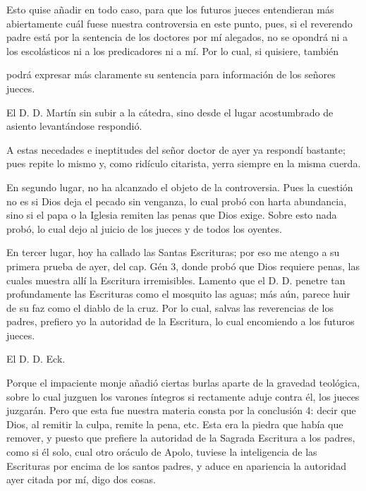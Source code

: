 Esto quise añadir en todo caso, para que los futuros jueces entendieran más abiertamente cuál fuese nuestra controversia en este punto, pues, si el reverendo padre está por la sentencia de los doctores por mí alegados, no se opondrá ni a los escolásticos ni a los predicadores ni a mí. Por lo cual, si quisiere, también

podrá expresar más claramente su sentencia para información de los señores jueces.

El D. D. Martín
sin subir a la cátedra, sino desde el lugar acostumbrado de asiento
levantándose respondió.

A estas necedades e ineptitudes del señor doctor de ayer ya respondí bastante; pues repite lo mismo y, como ridículo citarista, yerra siempre en la misma cuerda.

En segundo lugar, no ha alcanzado el objeto de la controversia. Pues la cuestión no es si Dios deja el pecado sin venganza, lo cual probó con harta abundancia, sino si el papa o la Iglesia remiten las penas que Dios exige. Sobre esto nada probó, lo cual dejo al juicio de los jueces y de todos los oyentes.

En tercer lugar, hoy ha callado las Santas Escrituras; por eso me atengo a su primera prueba de ayer, del cap. Gén 3, donde probó que Dios requiere penas, las cuales muestra allí la Escritura irremisibles. Lamento que el D. D. penetre tan profundamente las Escrituras como el mosquito las aguas; más aún, parece huir de su faz como el diablo de la cruz. Por lo cual, salvas las reverencias de los padres, prefiero yo la autoridad de la Escritura, lo cual encomiendo a los futuros jueces.

El D. D. Eck.

Porque el impaciente monje añadió ciertas burlas aparte de la gravedad teológica, sobre lo cual juzguen los varones íntegros si rectamente aduje contra él, los jueces juzgarán. Pero que esta fue nuestra materia consta por la conclusión 4: decir que Dios, al remitir la culpa, remite la pena, etc. Esta era la piedra que había que remover, y puesto que prefiere la autoridad de la Sagrada Escritura a los padres, como si él solo, cual otro oráculo de Apolo, tuviese la inteligencia de las Escrituras por encima de los santos padres, y aduce en apariencia la autoridad ayer citada por mí, digo dos cosas.

